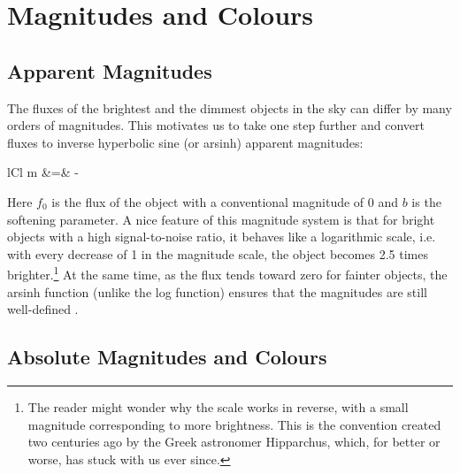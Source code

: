 \section{Magnitudes and Colours}
\subsection{Apparent Magnitudes}
The fluxes of the brightest and the dimmest objects in the sky can differ by many orders of
magnitudes. This motivates us to take one step further and convert fluxes to inverse
hyperbolic sine (or arsinh) apparent magnitudes:
	\begin{IEEEeqnarray*}{lCl}
		m &=& - 
	\end{IEEEeqnarray*}
Here $f_0$ is the flux of the object with a conventional magnitude of 0 and $b$ is the
softening parameter. A nice feature of this magnitude system is that for bright objects
with a high signal-to-noise ratio, it behaves like a logarithmic scale, i.e. with
every decrease of 1 in the magnitude scale, the object becomes 2.5 times brighter.\footnote{
	The reader might wonder why the scale works in reverse, with a small magnitude
	corresponding to more brightness. This is the convention created two centuries ago by
	the Greek astronomer Hipparchus, which, for better or worse, has stuck with us ever since.}
At the same time, as the flux tends toward zero for fainter objects, the arsinh function
(unlike the log function) ensures that the magnitudes are still well-defined \cite{lupton99}.

\subsection{Absolute Magnitudes and Colours}
\label{sub:colours}

